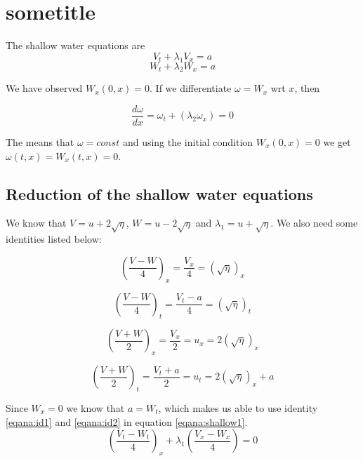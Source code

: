 \documentclass[11pt]{article}
\begin{document}
\section{sometitle}

The shallow water equations are 
\begin{equation}
V_t + \lambda_1 V_x = a
\label{eqana:shallow1}
\end{equation}
\begin{equation}
W_t + \lambda_2 W_x = a
\label{eqana:shallow2}
\end{equation}

We have observed $W_x(0,x) = 0$. If we differentiate $\omega = W_x$ wrt $x$, then

\begin{equation}
\frac{d \omega}{d x} = \omega_t + \left( \lambda_2 \omega_x \right) = 0
\end{equation}

The means that $\omega = const$ and using the initial condition $W_x(0,x) = 0$ we get $\omega(t,x) = W_x(t,x) = 0$.

\subsection{Reduction of the shallow water equations}
We know that $V = u + 2 \sqrt{\eta}$, $W = u - 2 \sqrt{\eta}$ and $\lambda_1 = u + \sqrt{\eta}$. We also need some identities listed below:

\begin{equation}
\left(\frac{V-W}{4}\right)_x = \frac{V_x}{4} = \left( \sqrt{\eta}\right)_x
\label{eqana:id1}
\end{equation}

\begin{equation}
\left(\frac{V-W}{4}\right)_t = \frac{V_t - a}{4} = \left( \sqrt{\eta}\right)_t
\label{eqana:id2}
\end{equation}

\begin{equation}
\left(\frac{V+W}{2}\right)_x = \frac{V_x}{2} = u_x = 2\left( \sqrt{\eta}\right)_x
\label{eqana:id3}
\end{equation}

\begin{equation}
\left(\frac{V+W}{2}\right)_t = \frac{V_t + a}{2} = u_t = 2\left( \sqrt{\eta}\right)_x + a
\label{eqana:id4}
\end{equation}

Since $W_x = 0$ we know that $a = W_t$, which makes us able to use identity \ref{eqana:id1} and \ref{eqana:id2} in equation \ref{eqana:shallow1}.
\begin{equation}
\left( \frac{V_t - W_t}{4} \right)_x + \lambda_1 \left( \frac{V_x - W_x}{4} \right) = 0
\end{equation}
\end{document}
